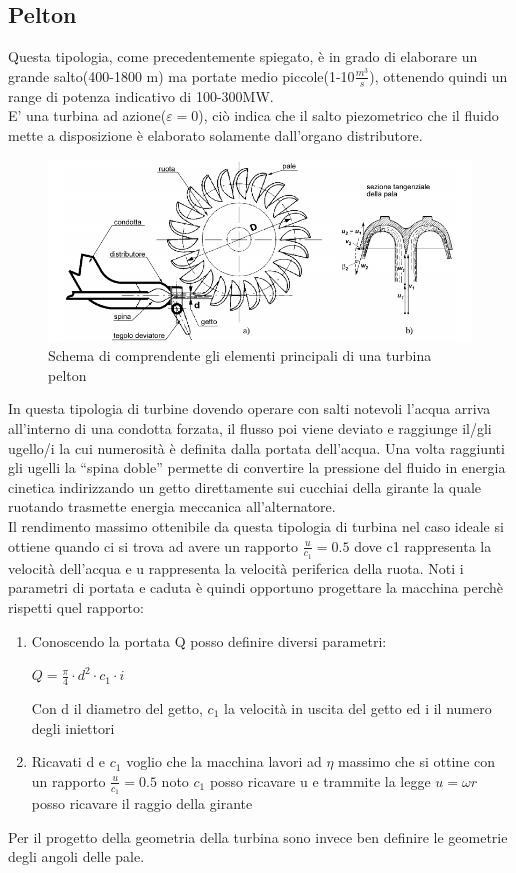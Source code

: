 \subsection{Pelton}
Questa tipologia, come precedentemente spiegato, è in grado di elaborare un grande salto(400-1800 m) ma portate medio piccole(1-10$\frac{m^3}{s}$), ottenendo quindi un range di potenza indicativo di 100-300MW.\\
E' una turbina ad azione($\varepsilon=0$), ciò indica che il salto piezometrico che il fluido mette a disposizione è elaborato solamente dall'organo distributore.
\begin{figure}[H]
    \centering
    \includegraphics[height=0.4\textwidth]{res/cap 3/pelton}
    \caption{Schema di comprendente gli elementi principali di una turbina pelton}
\end{figure}\noindent
In questa tipologia di turbine dovendo operare con salti notevoli l'acqua arriva all'interno di una condotta forzata, il flusso poi viene deviato e raggiunge il/gli ugello/i la cui numerosità è definita dalla portata dell'acqua.
Una volta raggiunti gli ugelli la \enquote{spina doble} permette di convertire la pressione del fluido in energia cinetica indirizzando un getto direttamente sui cucchiai della girante la quale ruotando trasmette energia meccanica all'alternatore.\\
Il rendimento massimo ottenibile da questa tipologia di turbina nel caso ideale si ottiene quando ci si trova ad avere un rapporto $\frac{u}{c_1}=0.5$ dove c1 rappresenta la velocità dell'acqua e u rappresenta la velocità periferica della ruota.
Noti i parametri di portata e caduta è quindi opportuno progettare la macchina perchè rispetti quel rapporto:\\
\begin{enumerate}
    \item Conoscendo la portata Q posso definire diversi parametri:\\
        \begin{center}
            \large{$Q=\frac{\pi}{4}\cdot d^2 \cdot c_1 \cdot i$}
        \end{center}
        Con d il diametro del getto, \large{$c_1$} la velocità in uscita del getto ed i il numero degli iniettori
    \item Ricavati d e \large{$c_1$} voglio che la macchina lavori ad \large{$\eta$} massimo che si ottine con un rapporto \large{$\frac{u}{c_1}=0.5$} noto \large{$c_1$} posso ricavare u e trammite la legge \large{$u=\omega r$} posso ricavare il raggio della girante
\end{enumerate}
Per il progetto della geometria della turbina sono invece ben definire le geometrie degli angoli delle pale.
